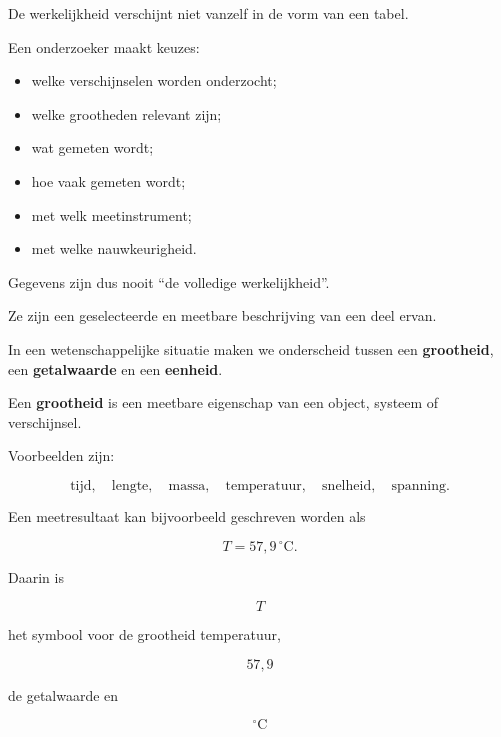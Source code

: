 \documentclass{ximera}
\begin{document}

De werkelijkheid verschijnt niet vanzelf in de vorm van een tabel.

Een onderzoeker maakt keuzes:

\begin{itemize}
  \item welke verschijnselen worden onderzocht;
  \item welke grootheden relevant zijn;
  \item wat gemeten wordt;
  \item hoe vaak gemeten wordt;
  \item met welk meetinstrument;
  \item met welke nauwkeurigheid.
\end{itemize}

Gegevens zijn dus nooit ``de volledige werkelijkheid''.

Ze zijn een geselecteerde en meetbare beschrijving van een deel ervan.




In een wetenschappelijke situatie maken we onderscheid tussen een
\textbf{grootheid}, een \textbf{getalwaarde} en een
\textbf{eenheid}.

\begin{definitie}[Grootheid]

Een \textbf{grootheid} is een meetbare eigenschap van een object,
systeem of verschijnsel.

Voorbeelden zijn:

\[
\text{tijd},\quad
\text{lengte},\quad
\text{massa},\quad
\text{temperatuur},\quad
\text{snelheid},\quad
\text{spanning}.
\]

\end{definitie}

Een meetresultaat kan bijvoorbeeld geschreven worden als

\[
T=57{,}9\,^\circ\mathrm C.
\]

Daarin is

\[
T
\]

het symbool voor de grootheid temperatuur,

\[
57{,}9
\]

de getalwaarde en

\[
^\circ\mathrm C
\]
\end{document}
